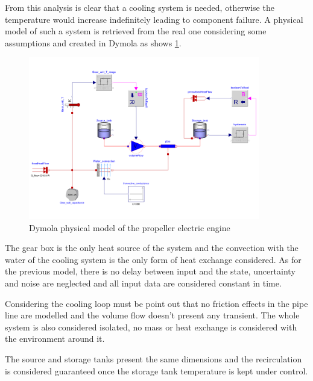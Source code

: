 \documentclass[11pt,a4paper,oneside]{article}
\begin{document}
From this analysis is clear that a cooling system is needed, otherwise the temperature would increase indefinitely leading to component failure.
A physical model of such a system is retrieved from the real one considering some assumptions and created in Dymola as shows \cref{fig:ex2b_coolingModel}.
\begin{figure}[H]
    \centering
    \includegraphics*[width=0.9\textwidth, keepaspectratio]{Figures/ex2b_blockDiag.pdf}
    \caption[]{\label{fig:ex2b_coolingModel} Dymola physical model of the propeller electric engine}
\end{figure}

The gear box is the only heat source of the system and the convection with the water of the cooling system is the only form of heat exchange considered. 
As for the previous model, there is no delay between input and the state, uncertainty and noise are neglected and all input data are considered constant in time. 

Considering the cooling loop must be point out that no friction effects in the pipe line are modelled and the volume flow doesn't present any transient.
The whole system is also considered isolated, no mass or heat exchange is considered with the environment around it.

The source and storage tanks present the same dimensions and the recirculation is considered guaranteed once the storage tank temperature is kept under control.
\end{document}
